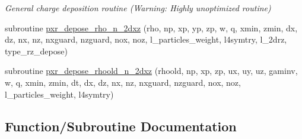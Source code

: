 \begin{DoxyCompactItemize}
\begin{DoxyCompactList}\small\item\em General charge deposition routine (Warning\+: Highly unoptimized routine) \end{DoxyCompactList}\item 
subroutine \hyperlink{charge__deposition_8_f90_a899c2820e69c525f781f0a6c62d3b116}{pxr\+\_\+depose\+\_\+rho\+\_\+n\+\_\+2dxz} (rho, np, xp, yp, zp, w, q, xmin, zmin, dx, dz, nx, nz, nxguard, nzguard, nox, noz, l\+\_\+particles\+\_\+weight, l4symtry, l\+\_\+2drz, type\+\_\+rz\+\_\+depose)
\item 
subroutine \hyperlink{charge__deposition_8_f90_a496878f2bdf85d8dec4a059d6bc40a0f}{pxr\+\_\+depose\+\_\+rhoold\+\_\+n\+\_\+2dxz} (rhoold, np, xp, zp, ux, uy, uz, gaminv, w, q, xmin, zmin, dt, dx, dz, nx, nz, nxguard, nzguard, nox, noz, l\+\_\+particles\+\_\+weight, l4symtry)
\end{DoxyCompactItemize}


\subsection{Function/\+Subroutine Documentation}

